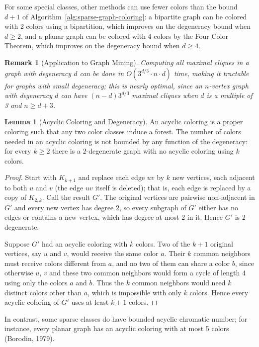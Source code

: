 \documentclass{article}
\newtheorem{remark}{Remark}
\theoremstyle{definition}
\newtheorem{lemma}{Lemma}
\begin{document}
For some special classes, other methods can use fewer colors than the bound $d+1$ of Algorithm~\ref{alg:sparse-graph-coloring}: a bipartite graph can be colored with 2 colors using a bipartition, which improves on the degeneracy bound when $d \geq 2$, and a planar graph can be colored with 4 colors by the Four Color Theorem, which improves on the degeneracy bound when $d \geq 4$.

\begin{remark}[Application to Graph Mining]
Computing all maximal cliques in a graph with degeneracy $d$ can be done in $O(3^{d/3} \cdot n \cdot d)$ time, making it tractable for graphs with small degeneracy; this is nearly optimal, since an $n$-vertex graph with degeneracy $d$ can have $(n-d)3^{d/3}$ maximal cliques when $d$ is a multiple of 3 and $n \geq d+3$.
\end{remark}

\begin{lemma}[Acyclic Coloring and Degeneracy]
An acyclic coloring is a proper coloring such that any two color classes induce a forest. The number of colors needed in an acyclic coloring is not bounded by any function of the degeneracy: for every $k \geq 2$ there is a $2$-degenerate graph with no acyclic coloring using $k$ colors.
\end{lemma}

\begin{proof}
Start with $K_{k+1}$ and replace each edge $uv$ by $k$ new vertices, each adjacent to both $u$ and $v$ (the edge $uv$ itself is deleted); that is, each edge is replaced by a copy of $K_{2,k}$. Call the result $G'$. The original vertices are pairwise non-adjacent in $G'$ and every new vertex has degree 2, so every subgraph of $G'$ either has no edges or contains a new vertex, which has degree at most 2 in it. Hence $G'$ is 2-degenerate.

Suppose $G'$ had an acyclic coloring with $k$ colors. Two of the $k+1$ original vertices, say $u$ and $v$, would receive the same color $a$. Their $k$ common neighbors must receive colors different from $a$, and no two of them can share a color $b$, since otherwise $u$, $v$ and these two common neighbors would form a cycle of length 4 using only the colors $a$ and $b$. Thus the $k$ common neighbors would need $k$ distinct colors other than $a$, which is impossible with only $k$ colors. Hence every acyclic coloring of $G'$ uses at least $k+1$ colors.
\end{proof}

In contrast, some sparse classes do have bounded acyclic chromatic number; for instance, every planar graph has an acyclic coloring with at most 5 colors (Borodin, 1979).
\end{document}
